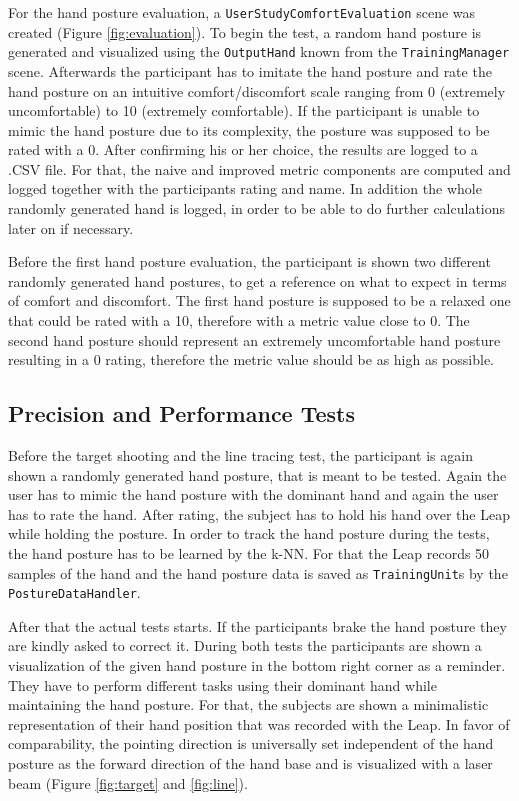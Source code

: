 For the hand posture evaluation, a \texttt{UserStudyComfortEvaluation} scene was created (Figure \ref{fig:evaluation}). To begin the test, a random hand posture is generated and visualized using the \texttt{OutputHand} known from the \texttt{TrainingManager} scene. Afterwards the participant has to imitate the hand posture and rate the hand posture on an intuitive comfort/discomfort scale ranging from 0 (extremely uncomfortable) to 10 (extremely comfortable). If the participant is unable to mimic the hand posture due to its complexity, the posture was supposed to be rated with a 0. After confirming his or her choice, the results are logged to a .CSV file. For that, the naive and improved metric components are computed and logged together with the participants rating and name. In addition the whole randomly generated hand is logged, in order to be able to do further calculations later on if necessary.

Before the first hand posture evaluation, the participant is shown two different randomly generated hand postures, to get a reference on what to expect in terms of comfort and discomfort. The first hand posture is supposed to be a relaxed one that could be rated with a 10, therefore with a metric value close to 0. The second hand posture should represent an extremely uncomfortable hand posture resulting in a 0 rating, therefore the metric value should be as high as possible.

\subsection{Precision and Performance Tests}

Before the target shooting and the line tracing test, the participant is again shown a randomly generated hand posture, that is meant to be tested. Again the user has to mimic the hand posture with the dominant hand and again the user has to rate the hand. After rating, the subject has to hold his hand over the Leap while holding the posture. In order to track the hand posture during the tests, the hand posture has to be learned by the k-NN. For that the Leap records 50 samples of the hand and the hand posture data is saved as \texttt{TrainingUnit}s by the \texttt{PostureDataHandler}. 

After that the actual tests starts. If the participants brake the hand posture they are kindly asked to correct it. During both tests the participants are shown a visualization of the given hand posture in the bottom right corner as a reminder. They have to perform different tasks using their dominant hand while maintaining the hand posture. 
For that, the subjects are shown a minimalistic representation of their hand position that was recorded with the Leap. In favor of comparability, the pointing direction is universally set independent of the hand posture as the forward direction of the hand base and is visualized with a laser beam (Figure \ref{fig:target} and \ref{fig:line}). 

